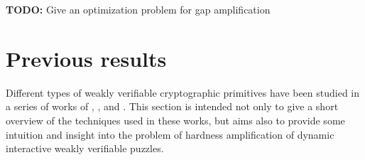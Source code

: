 \documentclass[11pt,a4paper,titlepage]{memoir}
\begin{document}
\begin{todo}
  \textbf{TODO:} Give an optimization problem for gap amplification
\end{todo}


\section{Previous results}
Different types of weakly verifiable cryptographic primitives have been studied in a series of works of \cite{canetti2004hardness},
\cite{Dodis:2009:SAI:1530441.1530450}, and \cite{DBLP:journals/corr/abs-1002-3534}.
This section is intended not only to give a short overview of the techniques used in these works,
but aims also to provide some intuition and insight into the problem of hardness amplification
of dynamic interactive weakly verifiable puzzles.
\label{st:previous_results}
\end{document}
